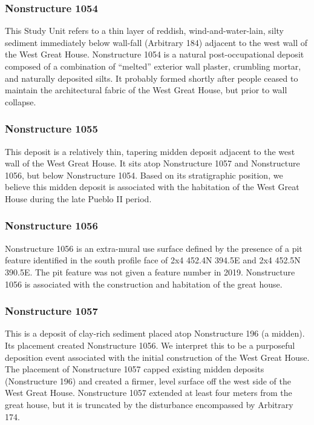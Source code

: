 \documentclass[
  12pt,
]{krantz}
\begin{document}
\hypertarget{nonstructure-1054}{%
\subsubsection{Nonstructure 1054}\label{nonstructure-1054}}

This Study Unit refers to a thin layer of reddish, wind-and-water-lain,
silty sediment immediately below wall-fall (Arbitrary 184) adjacent to
the west wall of the West Great House. Nonstructure 1054 is a natural
post-occupational deposit composed of a combination of ``melted'' exterior
wall plaster, crumbling mortar, and naturally deposited silts. It
probably formed shortly after people ceased to maintain the
architectural fabric of the West Great House, but prior to wall
collapse.

\hypertarget{nonstructure-1055}{%
\subsubsection{Nonstructure 1055}\label{nonstructure-1055}}

This deposit is a relatively thin, tapering midden deposit adjacent to
the west wall of the West Great House. It sits atop Nonstructure 1057
and Nonstructure 1056, but below Nonstructure 1054. Based on its
stratigraphic position, we believe this midden deposit is associated
with the habitation of the West Great House during the late Pueblo II
period.

\hypertarget{nonstructure-1056}{%
\subsubsection{Nonstructure 1056}\label{nonstructure-1056}}

Nonstructure 1056 is an extra-mural use surface defined by the presence
of a pit feature identified in the south profile face of 2x4 452.4N
394.5E and 2x4 452.5N 390.5E. The pit feature was not given a feature
number in 2019. Nonstructure 1056 is associated with the construction
and habitation of the great house.

\hypertarget{nonstructure-1057}{%
\subsubsection{Nonstructure 1057}\label{nonstructure-1057}}

This is a deposit of clay-rich sediment placed atop Nonstructure 196 (a
midden). Its placement created Nonstructure 1056. We interpret this to
be a purposeful deposition event associated with the initial
construction of the West Great House. The placement of Nonstructure 1057
capped existing midden deposits (Nonstructure 196) and created a firmer,
level surface off the west side of the West Great House. Nonstructure
1057 extended at least four meters from the great house, but it is
truncated by the disturbance encompassed by Arbitrary 174.
\end{document}
